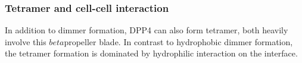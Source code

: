 \subsubsection{Tetramer and cell-cell interaction}

In addition to dimmer formation, DPP4 can also form tetramer, both heavily involve this $beta$propeller blade. In contrast to hydrophobic dimmer formation, the tetramer formation is dominated by hydrophilic interaction on the interface.~\cite{Engel_2003} 
